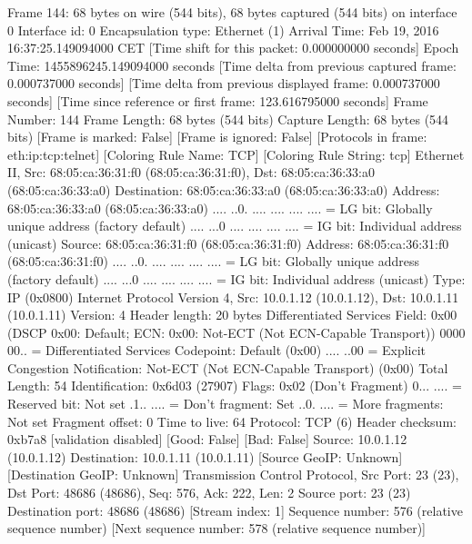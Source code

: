 Frame 144: 68 bytes on wire (544 bits), 68 bytes captured (544 bits) on interface 0
    Interface id: 0
    Encapsulation type: Ethernet (1)
    Arrival Time: Feb 19, 2016 16:37:25.149094000 CET
    [Time shift for this packet: 0.000000000 seconds]
    Epoch Time: 1455896245.149094000 seconds
    [Time delta from previous captured frame: 0.000737000 seconds]
    [Time delta from previous displayed frame: 0.000737000 seconds]
    [Time since reference or first frame: 123.616795000 seconds]
    Frame Number: 144
    Frame Length: 68 bytes (544 bits)
    Capture Length: 68 bytes (544 bits)
    [Frame is marked: False]
    [Frame is ignored: False]
    [Protocols in frame: eth:ip:tcp:telnet]
    [Coloring Rule Name: TCP]
    [Coloring Rule String: tcp]
Ethernet II, Src: 68:05:ca:36:31:f0 (68:05:ca:36:31:f0), Dst: 68:05:ca:36:33:a0 (68:05:ca:36:33:a0)
    Destination: 68:05:ca:36:33:a0 (68:05:ca:36:33:a0)
        Address: 68:05:ca:36:33:a0 (68:05:ca:36:33:a0)
        .... ..0. .... .... .... .... = LG bit: Globally unique address (factory default)
        .... ...0 .... .... .... .... = IG bit: Individual address (unicast)
    Source: 68:05:ca:36:31:f0 (68:05:ca:36:31:f0)
        Address: 68:05:ca:36:31:f0 (68:05:ca:36:31:f0)
        .... ..0. .... .... .... .... = LG bit: Globally unique address (factory default)
        .... ...0 .... .... .... .... = IG bit: Individual address (unicast)
    Type: IP (0x0800)
Internet Protocol Version 4, Src: 10.0.1.12 (10.0.1.12), Dst: 10.0.1.11 (10.0.1.11)
    Version: 4
    Header length: 20 bytes
    Differentiated Services Field: 0x00 (DSCP 0x00: Default; ECN: 0x00: Not-ECT (Not ECN-Capable Transport))
        0000 00.. = Differentiated Services Codepoint: Default (0x00)
        .... ..00 = Explicit Congestion Notification: Not-ECT (Not ECN-Capable Transport) (0x00)
    Total Length: 54
    Identification: 0x6d03 (27907)
    Flags: 0x02 (Don't Fragment)
        0... .... = Reserved bit: Not set
        .1.. .... = Don't fragment: Set
        ..0. .... = More fragments: Not set
    Fragment offset: 0
    Time to live: 64
    Protocol: TCP (6)
    Header checksum: 0xb7a8 [validation disabled]
        [Good: False]
        [Bad: False]
    Source: 10.0.1.12 (10.0.1.12)
    Destination: 10.0.1.11 (10.0.1.11)
    [Source GeoIP: Unknown]
    [Destination GeoIP: Unknown]
Transmission Control Protocol, Src Port: 23 (23), Dst Port: 48686 (48686), Seq: 576, Ack: 222, Len: 2
    Source port: 23 (23)
    Destination port: 48686 (48686)
    [Stream index: 1]
    Sequence number: 576    (relative sequence number)
    [Next sequence number: 578    (relative sequence number)]

